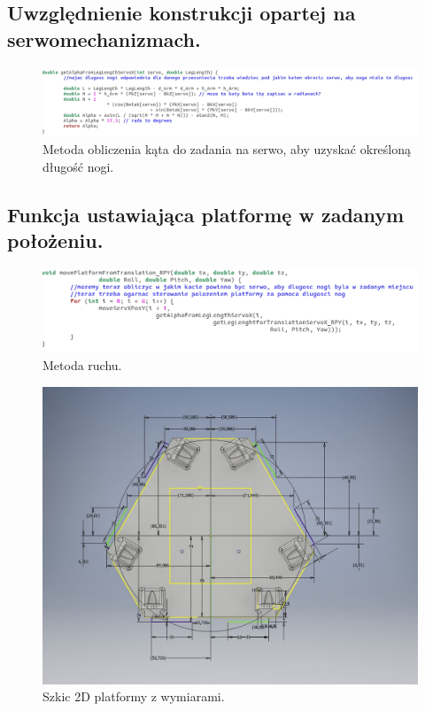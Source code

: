 \subsection{Uwzględnienie konstrukcji opartej na serwomechanizmach.}
\begin{figure}[!h]
    \label{fig:anzelm}
    \centering
    \includegraphics[width=\textwidth]{img/kod_inverse_kinematics_2.png}
    \caption{Metoda obliczenia kąta do zadania na serwo, aby uzyskać określoną długość nogi.}
\end{figure}


\subsection{Funkcja ustawiająca platformę w zadanym położeniu.}
\begin{figure}[!h]
    \label{fig:anzelm}
    \centering
    \includegraphics[width=\textwidth]{img/kod_inverse_kinematics_3.png}
    \caption{Metoda ruchu.}
\end{figure}



\begin{figure}[!h]
    \label{fig:anzelm}
    \centering
    \includegraphics[width=0.5\linewidth]{img/Base_2D_messy.JPG}
    \caption{Szkic 2D platformy z wymiarami.}
\end{figure}

